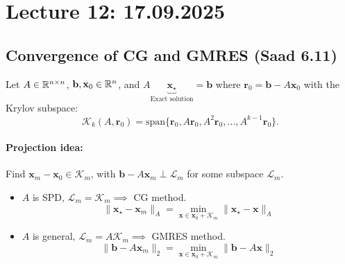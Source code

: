 \section{Lecture 12: 17.09.2025}

\subsection{Convergence of CG and GMRES (Saad 6.11)}
Let $A \in \mathbb{R}^{n \times n}$, $\mathbf{b}, \mathbf{x}_0 \in \mathbb{R}^n$, and $A \underbrace{\mathbf{x}_{\star}}_{\text{Exact solution}} = \mathbf{b}$ where $\mathbf{r}_0 = \mathbf{b} - A \mathbf{x}_0$ with the Krylov subspace:
\[
    \mathcal{K}_k(A, \mathbf{r}_0) = \text{span} \{\mathbf{r}_0, A \mathbf{r}_0, A^2 \mathbf{r}_0, \ldots, A^{k-1} \mathbf{r}_0\}.
\]
\paragraph{Projection idea:}
Find $\mathbf{x}_m - \mathbf{x}_0 \in \mathcal{K}_m$, with $\mathbf{b} - A \mathbf{x}_m \perp \mathcal{L}_m$ for some subspace $\mathcal{L}_m$.
\begin{itemize}
    \item $A$ is SPD, $\mathcal{L}_m = \mathcal{K}_m \implies$ CG method.
          \[
              \|\mathbf{x}_{\star} - \mathbf{x}_m\|_A = \min_{\mathbf{x} \in \mathbf{x}_0 + \mathcal{K}_m} \|\mathbf{x}_{\star} - \mathbf{x}\|_A \tag{CG}
          \]
    \item $A$ is general, $\mathcal{L}_m = A \mathcal{K}_m \implies$ GMRES method.
          \[
              \|\mathbf{b} - A \mathbf{x}_m\|_2 = \min_{\mathbf{x} \in \mathbf{x}_0 + \mathcal{K}_m} \|\mathbf{b} - A \mathbf{x}\|_2 \tag{GMRES}
          \]
\end{itemize}
